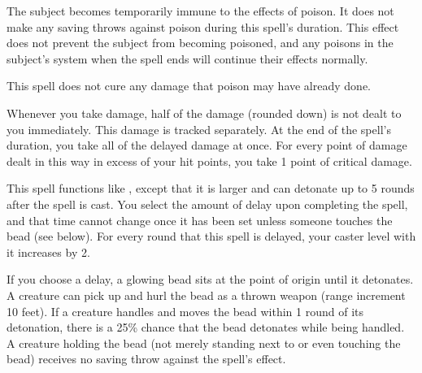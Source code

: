 \spellrng{\rngclose}
\spelldur{\durshort}
\begin{spelleffect}
  The subject becomes temporarily immune to the effects of poison. It does not make any saving throws against poison during this spell's duration. This effect does not prevent the subject from becoming poisoned, and any poisons in the subject's system when the spell ends will continue their effects normally. 
\end{spelleffect}
\begin{spellnotes}
  This spell does not cure any damage that poison may have already done.
\end{spellnotes}

\spelldur{\durmed}
\begin{spelleffect}
    Whenever you take damage, half of the damage (rounded down) is not dealt to you immediately. This damage is tracked separately. At the end of the spell's duration, you take all of the delayed damage at once. For every point of damage dealt in this way in excess of your hit points, you take 1 point of critical damage.
\end{spelleffect}

\begin{spelleffect}
  This spell functions like , except that it is larger and can detonate up to 5 rounds after the spell is cast. You select the amount of delay upon completing the spell, and that time cannot change once it has been set unless someone touches the bead (see below). For every round that this spell is delayed, your caster level with it increases by 2.

  If you choose a delay, a glowing bead sits at the point of origin until it detonates. A creature can pick up and hurl the bead as a thrown weapon (range increment 10 feet). If a creature handles and moves the bead within 1 round of its detonation, there is a 25\% chance that the bead detonates while being handled. A creature holding the bead (not merely standing next to or even touching the bead) receives no saving throw against the spell's effect.
\end{spelleffect}

